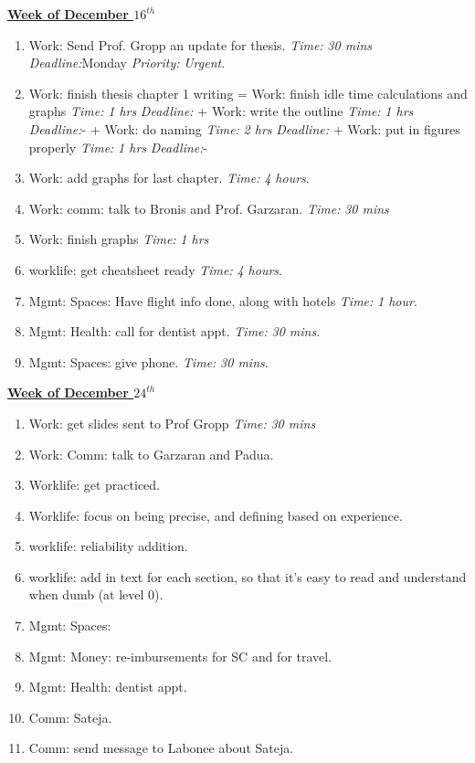 \documentclass[11pt]{article}
\newcommand{\timeEst}[1]{\textit{Time:} \textit{#1}}
\newcommand{\te}[1]{\textit{Time:} \textit{#1}}
\newcommand{\pr}[1]{\textit{Priority:} \textit{#1}}
\newcommand{\dl}[1]{\textit{Deadline:}#1}
\begin{document}
            {\small \underline{\textbf{Week of December $16^{th}$}} }
             \begin{enumerate} 
             \item \tiny Work: Send Prof. Gropp an update for
               thesis. \te{30 mins} \dl{Monday}  \pr{Urgent}. 
             \item \tiny Work: finish thesis chapter 1 writing =
               Work: finish idle time calculations and graphs \te{1
                 hrs} \dl{}  +  Work: write the
               outline \te{1 hrs} \dl{-} + Work: do naming \te{2 hrs}
               \dl{} +  Work: put in figures
               properly \te{1 hrs} \dl{-} 
             \item \tiny Work: add graphs for last chapter. \te{4
               hours}. 
             \item \tiny Work: comm: talk to Bronis and
               Prof. Garzaran. \te{30 mins} 
             \item \tiny Work: finish graphs \te{1 hrs} 
             \item \tiny worklife: get cheatsheet ready \timeEst{4 hours}.
             \item \tiny Mgmt: Spaces: Have flight info done, along
               with hotels \timeEst{1 hour}.
             \item \tiny Mgmt: Health: call for dentist appt. 
               \te{30 mins}. 
             \item \tiny Mgmt: Spaces: give phone. \te{30 mins}.  
             \end{enumerate}

          {\small \underline{\textbf{Week of December $24^{th}$}} }
          \begin{enumerate}
            \tiny \item \tiny Work: get slides sent to Prof Gropp \timeEst{30 mins}
            \item \tiny Work: Comm: talk to Garzaran and Padua.
            \item \tiny Worklife: get practiced.
            \item \tiny Worklife: focus on being precise, and defining based on experience.
            \tiny \item \tiny worklife: reliability addition.
            \tiny \item \tiny worklife: add in text for each section, so that it's easy to read and understand when dumb (at level 0).
          \item \tiny Mgmt: Spaces:
          \item \tiny Mgmt: Money: re-imbursements for SC and for travel.
          \item \tiny Mgmt: Health: dentist appt.
          \item \tiny Comm: Sateja.
            \tiny \item \tiny Comm: send message to Labonee about Sateja. 
          \end{enumerate}
\end{document}
